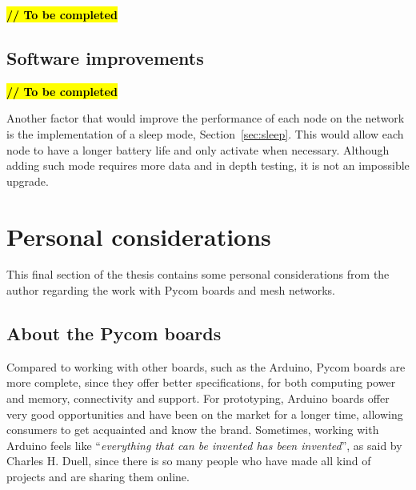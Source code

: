 		
			\textbf{\textcolor{red}{\hl{// To be completed}}}

		\subsection{Software improvements}\label{sec:software_improvements}
		
			\textbf{\textcolor{red}{\hl{// To be completed}}}
		
%			


			Another factor that would improve the performance of each node on the network is the implementation of a sleep mode, Section~\ref{sec:sleep}.
			This would allow each node to have a longer battery life and only activate when necessary.
			Although adding such mode requires more data and in depth testing, it is not an impossible upgrade.

	\section{Personal considerations}
	
		This final section of the thesis contains some personal considerations from the author regarding the work with Pycom boards and mesh networks.
	
		\subsection{About the Pycom boards}\label{sec:working_with_pycom}
		
			Compared to working with other boards, such as the Arduino, Pycom boards are more complete, since they offer better specifications, for both computing power and memory, connectivity and support.			
			For prototyping, Arduino boards offer very good opportunities and have been on the market for a longer time, allowing consumers to get acquainted and know the brand.
			Sometimes, working with Arduino feels like ``\textit{everything that can be invented has been invented}'', as said by Charles H. Duell, since there is so many people who have made all kind of projects and are sharing them online.
			
